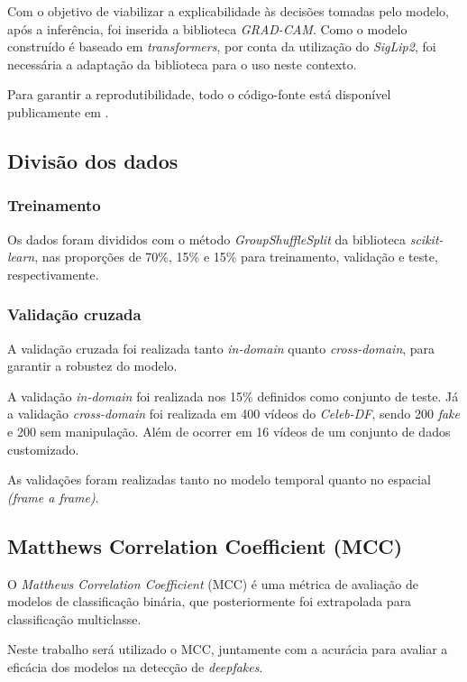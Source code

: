 \documentclass[12pt]{article}
\begin{document}
Com o objetivo de viabilizar a explicabilidade às decisões tomadas pelo modelo, após a inferência, foi inserida
a biblioteca \textit{GRAD-CAM}. \cite{gradcam2016}
Como o modelo construído é baseado em \textit{transformers}, por conta da utilização do \textit{SigLip2}, foi necessária
a adaptação da biblioteca para o uso neste contexto.

Para garantir a reprodutibilidade, todo o código-fonte está disponível publicamente em \cite{jessica_de_lima_fileto_2026_22003766}.

\subsection{Divisão dos dados}

\subsubsection{Treinamento}
Os dados foram divididos com o método \textit{GroupShuffleSplit}
da biblioteca \textit{scikit-learn}, nas proporções de 70\%, 15\% e 15\%
para treinamento, validação e teste, respectivamente.

\subsubsection{Validação cruzada}
A validação cruzada foi realizada tanto \textit{in-domain} quanto \textit{cross-domain}, para
garantir a robustez do modelo.

A validação \textit{in-domain} foi realizada nos 15\% definidos como conjunto de teste.
Já a validação \textit{cross-domain} foi realizada em 400 vídeos do \textit{Celeb-DF}, sendo
200 \textit{fake} e 200 sem manipulação. Além de ocorrer em 16 vídeos de um conjunto de dados customizado.

As validações foram realizadas tanto no modelo temporal quanto no espacial \textit{(frame a frame)}.


\subsection{Matthews Correlation Coefficient (MCC)}
O \textit{Matthews Correlation Coefficient} (MCC) é uma métrica
de avaliação de modelos de classificação binária,
que posteriormente foi extrapolada para classificação multiclasse. \cite{MCC}

Neste trabalho será utilizado o MCC,
juntamente com a acurácia para avaliar a eficácia
dos modelos na detecção de \textit{deepfakes}.
\end{document}
